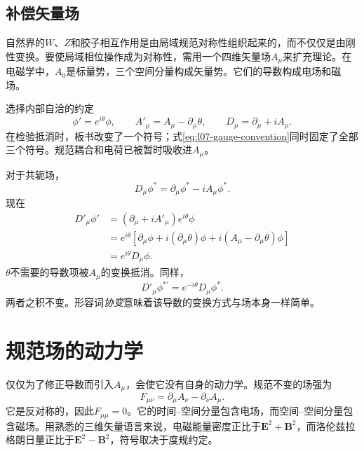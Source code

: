 \subsection{补偿矢量场}

自然界的\(W\)、\(Z\)和胶子相互作用是由局域规范对称性组织起来的，而不仅仅是由刚性变换。要使局域相位操作成为对称性，需用一个四维矢量场\(A_\mu\)来扩充理论。在电磁学中，\(A_0\)是标量势，三个空间分量构成矢量势。它们的导数构成电场和磁场。

选择内部自洽的约定
\begin{equation}
  \phi'=e^{i\theta}\phi,
  \qquad
  A'_\mu=A_\mu-\partial_\mu\theta,
  \qquad
  D_\mu=\partial_\mu+iA_\mu.
  \label{eq:l07-gauge-convention}
\end{equation}
在检验抵消时，板书改变了一个符号；式\eqref{eq:l07-gauge-convention}同时固定了全部三个符号。规范耦合和电荷已被暂时吸收进\(A_\mu\)。

对于共轭场，
\begin{equation}
  D_\mu\phi^*=\partial_\mu\phi^*-iA_\mu\phi^*.
\end{equation}
现在
\begin{align}
  D'_\mu\phi'
  &=
  \left(\partial_\mu+iA'_\mu\right)e^{i\theta}\phi
  \nonumber\\
  &=
  e^{i\theta}
  \left[
    \partial_\mu\phi+i(\partial_\mu\theta)\phi
    +i(A_\mu-\partial_\mu\theta)\phi
  \right]
  \nonumber\\
  &=e^{i\theta}D_\mu\phi.
  \label{eq:l07-covariant-transform}
\end{align}
\(\theta\)不需要的导数项被\(A_\mu\)的变换抵消。同样，
\begin{equation}
  D'_\mu\phi^{*\prime}=e^{-i\theta}D_\mu\phi^*.
\end{equation}
两者之积不变。形容词\emph{协变}意味着该导数的变换方式与场本身一样简单。

\section{规范场的动力学}

仅仅为了修正导数而引入\(A_\mu\)，会使它没有自身的动力学。规范不变的场强为
\begin{equation}
  F_{\mu\nu}
  =\partial_\mu A_\nu-\partial_\nu A_\mu.
  \label{eq:l07-field-strength}
\end{equation}
它是反对称的，因此\(F_{\mu\mu}=0\)。它的时间--空间分量包含电场，而空间--空间分量包含磁场。用熟悉的三维矢量语言来说，电磁能量密度正比于\(\bm E^2+\bm B^2\)，而洛伦兹拉格朗日量正比于\(\bm E^2-\bm B^2\)，符号取决于度规约定。

